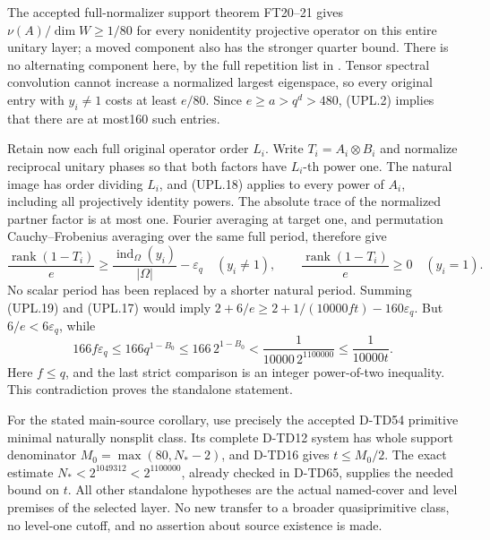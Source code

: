 The accepted full-normalizer support theorem FT20--21 gives
\(\nu(A)/\dim W\ge1/80\) for every nonidentity projective operator
on this entire unitary layer; a moved component also has the
stronger quarter bound. There is no alternating component here, by
the full repetition list in
\cite[author Section~2.2.1, p.~13]{HES:LiXia2022}.
Tensor spectral convolution cannot increase a normalized largest
eigenspace, so every original entry with \(y_i\ne1\) costs at
least \(e/80\). Since \(e\ge a>q^d>480\), (UPL.2) implies
that there are at most160 such entries.

Retain now each full original operator order \(L_i\).
Write \(T_i=A_i\otimes B_i\) and normalize reciprocal unitary
phases so that both factors have \(L_i\)-th power one.
The natural image has order dividing \(L_i\), and
(UPL.18) applies to every power of \(A_i\), including all
projectively identity powers. The absolute trace of the normalized
partner factor is at most one. Fourier averaging at target one,
and permutation Cauchy--Frobenius averaging over the same full
period, therefore give
\[
 \frac{\operatorname{rank}(1-T_i)}e
       \ge\frac{\operatorname{ind}_\Omega(y_i)}{|\Omega|}
               -\varepsilon_q\quad(y_i\ne1),
 \qquad
 \frac{\operatorname{rank}(1-T_i)}e\ge0\quad(y_i=1).
 \tag{UPL.19}
\]
No scalar period has been replaced by a shorter natural period.
Summing (UPL.19) and (UPL.17) would imply
\(2+6/e\ge2+1/(10000ft)-160\varepsilon_q\).
But \(6/e<6\varepsilon_q\), while
\[
 166f\varepsilon_q\le166q^{1-B_0}
     \le166\,2^{1-B_0}<\frac1{10000\,2^{1100000}}
     \le\frac1{10000t}.
 \tag{UPL.20}
\]
Here \(f\le q\), and the last strict comparison is an integer
power-of-two inequality. This contradiction proves the standalone
statement.

For the stated main-source corollary, use precisely the accepted
D-TD54 primitive minimal naturally nonsplit class. Its complete
D-TD12 system has whole support denominator
\(M_0=\max(80,N_*-2)\), and D-TD16 gives \(t\le M_0/2\).
The exact estimate \(N_*<2^{1049312}<2^{1100000}\), already
checked in D-TD65, supplies the needed bound on \(t\).
All other standalone hypotheses are the actual named-cover and
level premises of the selected layer. No new transfer to a broader
quasiprimitive class, no level-one cutoff, and no assertion about
source existence is made.
